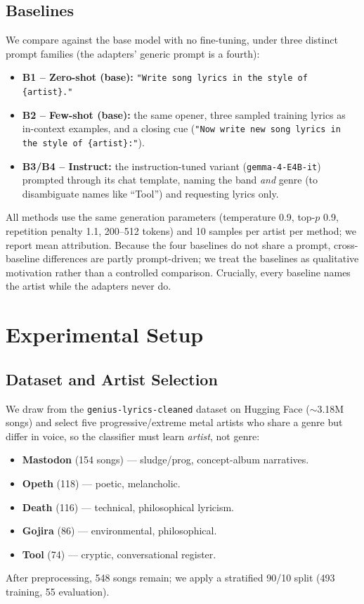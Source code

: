 \documentclass[runningheads]{llncs}
\begin{document}
\subsection{Baselines}
We compare against the base model with no fine-tuning, under three distinct prompt families (the adapters' generic prompt is a fourth):
\begin{itemize}
    \item \textbf{B1 -- Zero-shot (base):} \texttt{"Write song lyrics in the style of \{artist\}."}
    \item \textbf{B2 -- Few-shot (base):} the same opener, three sampled training lyrics as in-context examples, and a closing cue (\texttt{"Now write new song lyrics in the style of \{artist\}:"}).
    \item \textbf{B3/B4 -- Instruct:} the instruction-tuned variant (\texttt{gemma-4-E4B-it}) prompted through its chat template, naming the band \emph{and} genre (to disambiguate names like ``Tool'') and requesting lyrics only.
\end{itemize}
All methods use the same generation parameters (temperature 0.9, top-$p$ 0.9, repetition penalty 1.1, 200--512 tokens) and 10 samples per artist per method; we report mean attribution. Because the four baselines do not share a prompt, cross-baseline differences are partly prompt-driven; we treat the baselines as qualitative motivation rather than a controlled comparison. Crucially, every baseline names the artist while the adapters never do.

\section{Experimental Setup}
\label{sec:setup}

\subsection{Dataset and Artist Selection}
We draw from the \texttt{genius-lyrics-cleaned} dataset on Hugging Face (${\sim}$3.18M songs) and select five progressive/extreme metal artists who share a genre but differ in voice, so the classifier must learn \emph{artist}, not genre:
\begin{itemize}
    \item \textbf{Mastodon} (154 songs) --- sludge/prog, concept-album narratives.
    \item \textbf{Opeth} (118) --- poetic, melancholic.
    \item \textbf{Death} (116) --- technical, philosophical lyricism.
    \item \textbf{Gojira} (86) --- environmental, philosophical.
    \item \textbf{Tool} (74) --- cryptic, conversational register.
\end{itemize}
After preprocessing, 548 songs remain; we apply a stratified 90/10 split (493 training, 55 evaluation).
\end{document}
